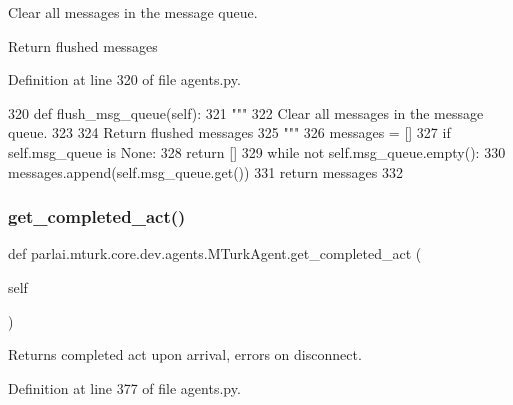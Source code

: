 \begin{DoxyVerb}Clear all messages in the message queue.

Return flushed messages
\end{DoxyVerb}
 

Definition at line 320 of file agents.\+py.


\begin{DoxyCode}
320     \textcolor{keyword}{def }flush\_msg\_queue(self):
321         \textcolor{stringliteral}{"""}
322 \textcolor{stringliteral}{        Clear all messages in the message queue.}
323 \textcolor{stringliteral}{}
324 \textcolor{stringliteral}{        Return flushed messages}
325 \textcolor{stringliteral}{        """}
326         messages = []
327         \textcolor{keywordflow}{if} self.msg\_queue \textcolor{keywordflow}{is} \textcolor{keywordtype}{None}:
328             \textcolor{keywordflow}{return} []
329         \textcolor{keywordflow}{while} \textcolor{keywordflow}{not} self.msg\_queue.empty():
330             messages.append(self.msg\_queue.get())
331         \textcolor{keywordflow}{return} messages
332 
\end{DoxyCode}
\mbox{\label{classparlai_1_1mturk_1_1core_1_1dev_1_1agents_1_1MTurkAgent_a81c9e542c8ee09cf424c172f3fd00af2}} 
\subsubsection{\texorpdfstring{get\+\_\+completed\+\_\+act()}{get\_completed\_act()}}
{\footnotesize\ttfamily def parlai.\+mturk.\+core.\+dev.\+agents.\+M\+Turk\+Agent.\+get\+\_\+completed\+\_\+act (\begin{DoxyParamCaption}\item[{}]{self }\end{DoxyParamCaption})}

\begin{DoxyVerb}Returns completed act upon arrival, errors on disconnect.
\end{DoxyVerb}
 

Definition at line 377 of file agents.\+py.


